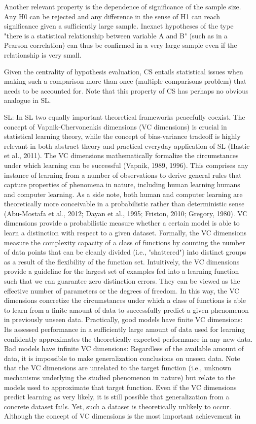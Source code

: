 \documentclass[authoryear,review,3p]{elsarticle}
\begin{document}
Another relevant property is the dependence of significance of the sample size. Any H0 can be rejected and any difference in the sense of H1 can reach significance given a sufficiently large sample.
Inexact hypotheses of the type "there is a statistical relationship between variable A and B" (such as in a Pearson correlation) can thus be confirmed in a very large sample even if the relationship is very small.

Given the centrality of hypothesis evaluation, CS entails statistical issues when making such a comparison more than once (multiple comparisons problem) that needs to be accounted for. Note that this property of CS has perhaps no obvious analogue in SL.

SL:
In SL two equally important theoretical frameworks peacefully coexist. The concept of Vapnik-Chervonenkis dimensions (VC dimensions) is crucial in statistical learning theory, while the concept of bias-variance tradeoff is highly relevant in both abstract theory and practical everyday application of SL (Hastie et al., 2011). The VC dimensions mathematically formalize the circumstances under which learning can be successful (Vapnik, 1989, 1996). This comprises any instance of learning from a number of observations to derive general rules that capture properties of phenomena in nature, including human learning humans and computer learning. As a side note, both human and computer learning are theoretically more conceivable in a probabilistic rather than deterministic sense (Abu-Mostafa et al., 2012; Dayan et al., 1995; Friston, 2010; Gregory, 1980). VC dimensions provide a probabilistic measure whether a certain model is able to learn a distinction with respect to a given dataset. Formally, the VC dimensions measure the complexity capacity of a class of functions by counting the number of data points that can be cleanly divided (i.e., "shattered") into distinct groups as a result of the flexibility of the function set. Intuitively, the VC dimensions provide a guideline for the largest set of examples fed into a learning function such that we can guarantee zero distinction errors. They can be viewed as the effective number of parameters or the degrees of freedom. In this way, the VC dimensions concretize the circumstances under which a class of functions is able to learn from a finite amount of data to successfully predict a given phenomenon in previously unseen data. Practically, good models have finite VC dimensions: Its assessed performance in a sufficiently large amount of data used for learning confidently approximates the theoretically expected performance in any new data. Bad models have infinite VC dimensions: Regardless of the available amount of data, it is impossible to make generalization conclusions on unseen data. Note that the VC dimensions are unrelated to the target function (i.e., unknown mechanisms underlying the studied phenomenon in nature) but relate to the models used to approximate that target function. Even if the VC dimensions predict learning as very likely, it is still possible that generalization from a concrete dataset fails. Yet, such a dataset is theoretically unlikely to occur. Although the concept of VC dimensions is the most important achievement in 
\end{document}
